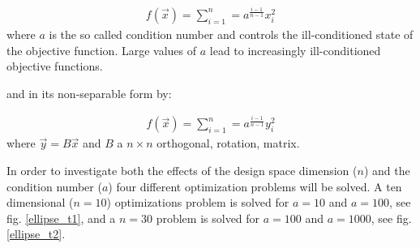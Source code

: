 \begin{eqnarray}
   f(\vec{x})=\sum^{n}_{i=1}=a^{\frac{i-1}{n-1}}x_i^2
   \label{ellipse} 
\end{eqnarray}
where $a$ is the so called condition number and controls the ill-conditioned state of the objective function. Large values of $a$ lead to increasingly ill-conditioned objective functions.

and in its non-separable form by:

\begin{eqnarray}
   f(\vec{x})=\sum^{n}_{i=1}=a^{\frac{i-1}{n-1}}y_i^2
   \label{ellipse} 
\end{eqnarray}
where $\vec{y}=B\vec{x}$ and $B$ a $n\times n$ orthogonal, rotation, matrix.

In order to investigate both the effects of the design space dimension ($n$) and the condition number ($a$) four different optimization problems will be solved. A ten dimensional ($n=10$) optimizations problem is solved for $a=10$ and $a=100$, see fig. \ref{ellipse_t1}, and a $n=30$ problem is solved for $a=100$ and $a=1000$, see fig. \ref{ellipse_t2}. 


